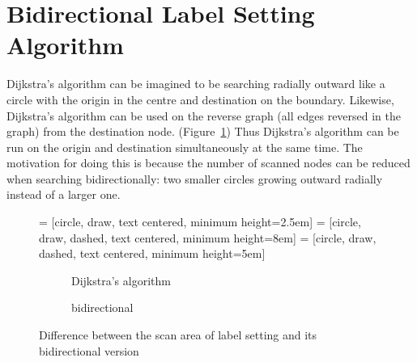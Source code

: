 \section{Bidirectional Label Setting Algorithm} \label{section:bidirectional}
Dijkstra's algorithm can be imagined to be searching radially outward like a circle with the origin in the centre and destination on the boundary.
Likewise, Dijkstra's algorithm can be used on the reverse graph (all edges reversed in the graph) from the destination node.
(Figure~\ref{fig:bidirect})
Thus Dijkstra's algorithm can be run on the origin and destination simultaneously at the same time.
The motivation for doing this is because the number of scanned nodes can be reduced when searching bidirectionally:
two smaller circles growing outward radially instead of a larger one.

\begin{figure}[H]
     = [circle, draw, text centered, minimum height=2.5em]
     = [circle, draw, dashed, text centered, minimum height=8em]
     = [circle, draw, dashed, text centered, minimum height=5em]
    \centering
    \begin{subfigure}[t]{.4\textwidth}
        \centering
        \caption{Dijkstra's algorithm}
    \end{subfigure}
    \begin{subfigure}[t]{.4\textwidth}
        \centering
        \caption{bidirectional}
    \end{subfigure}
    \caption{Difference between the scan area of label setting and its bidirectional version}
    \label{fig:bidirect}
\end{figure}

